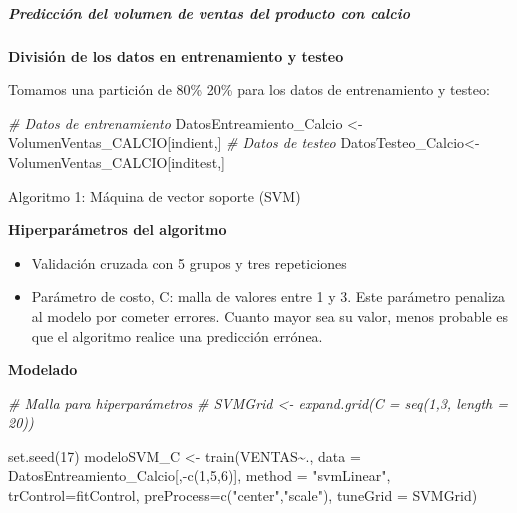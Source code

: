 \documentclass[
]{article}
\newenvironment{Shaded}{\begin{snugshade}}{\end{snugshade}}
\newcommand{\AttributeTok}[1]{\textcolor[rgb]{0.77,0.63,0.00}{#1}}
\newcommand{\CommentTok}[1]{\textcolor[rgb]{0.56,0.35,0.01}{\textit{#1}}}
\newcommand{\DecValTok}[1]{\textcolor[rgb]{0.00,0.00,0.81}{#1}}
\newcommand{\FunctionTok}[1]{\textcolor[rgb]{0.00,0.00,0.00}{#1}}
\newcommand{\NormalTok}[1]{#1}
\newcommand{\OtherTok}[1]{\textcolor[rgb]{0.56,0.35,0.01}{#1}}
\newcommand{\SpecialCharTok}[1]{\textcolor[rgb]{0.00,0.00,0.00}{#1}}
\newcommand{\StringTok}[1]{\textcolor[rgb]{0.31,0.60,0.02}{#1}}
\providecommand{\tightlist}{%
  \setlength{\itemsep}{0pt}\setlength{\parskip}{0pt}}
\begin{document}
\hypertarget{predicciuxf3n-del-volumen-de-ventas-del-producto-con-calcio}{%
\subparagraph{Predicción del volumen de ventas del producto con
calcio}\label{predicciuxf3n-del-volumen-de-ventas-del-producto-con-calcio}}

\textbf{División de los datos en entrenamiento y testeo}

Tomamos una partición de 80\% 20\% para los datos de entrenamiento y
testeo:

\begin{Shaded}
\begin{Highlighting}[]
\CommentTok{\# Datos de entrenamiento}
\NormalTok{DatosEntreamiento\_Calcio }\OtherTok{\textless{}{-}}\NormalTok{ VolumenVentas\_CALCIO[indient,]}
\CommentTok{\# Datos de testeo}
\NormalTok{DatosTesteo\_Calcio}\OtherTok{\textless{}{-}}\NormalTok{VolumenVentas\_CALCIO[inditest,]}
\end{Highlighting}
\end{Shaded}

Algoritmo 1: Máquina de vector soporte (SVM)

\textbf{Hiperparámetros del algoritmo}

\begin{itemize}
\tightlist
\item
  Validación cruzada con 5 grupos y tres repeticiones
\item
  Parámetro de costo, C: malla de valores entre 1 y 3. Este parámetro
  penaliza al modelo por cometer errores. Cuanto mayor sea su valor,
  menos probable es que el algoritmo realice una predicción errónea.
\end{itemize}

\textbf{Modelado}

\begin{Shaded}
\begin{Highlighting}[]
\CommentTok{\# Malla para hiperparámetros}
\CommentTok{\# SVMGrid \textless{}{-}  expand.grid(C = seq(1,3, length = 20))}

\FunctionTok{set.seed}\NormalTok{(}\DecValTok{17}\NormalTok{)}
\NormalTok{modeloSVM\_C }\OtherTok{\textless{}{-}} \FunctionTok{train}\NormalTok{(VENTAS}\SpecialCharTok{\textasciitilde{}}\NormalTok{., }
                \AttributeTok{data =}\NormalTok{ DatosEntreamiento\_Calcio[,}\SpecialCharTok{{-}}\FunctionTok{c}\NormalTok{(}\DecValTok{1}\NormalTok{,}\DecValTok{5}\NormalTok{,}\DecValTok{6}\NormalTok{)], }
                \AttributeTok{method =} \StringTok{"svmLinear"}\NormalTok{, }
                \AttributeTok{trControl=}\NormalTok{fitControl, }
                \AttributeTok{preProcess=}\FunctionTok{c}\NormalTok{(}\StringTok{"center"}\NormalTok{,}\StringTok{"scale"}\NormalTok{),}
                \AttributeTok{tuneGrid =}\NormalTok{ SVMGrid)}
\end{Highlighting}
\end{Shaded}
\end{document}
